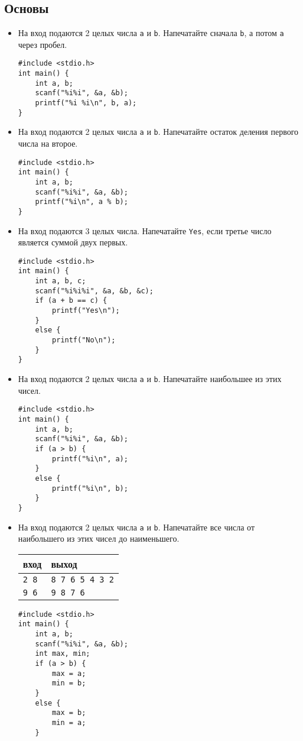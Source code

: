 \documentclass{article}
\begin{document}
\subsection*{Основы}
\begin{itemize}
\item На вход подаются 2 целых числа \texttt{a} и \texttt{b}. Напечатайте сначала \texttt{b}, а потом \texttt{a} через пробел.
\begin{lstlisting}[backgroundcolor = \color{solcolor}]
#include <stdio.h>
int main() {
    int a, b; 
    scanf("%i%i", &a, &b);
    printf("%i %i\n", b, a);
}
\end{lstlisting}
\item На вход подаются 2 целых числа \texttt{a} и \texttt{b}. Напечатайте остаток деления первого числа на второе.
\begin{lstlisting}[backgroundcolor = \color{solcolor}]
#include <stdio.h>
int main() {
    int a, b; 
    scanf("%i%i", &a, &b);
    printf("%i\n", a % b);
}
\end{lstlisting}
\item На вход подаются 3 целых числа. Напечатайте \texttt{Yes}, если третье число является суммой двух первых.
\begin{lstlisting}[backgroundcolor = \color{solcolor}]
#include <stdio.h>
int main() {
    int a, b, c; 
    scanf("%i%i%i", &a, &b, &c);
    if (a + b == c) {
        printf("Yes\n");
    }
    else {
        printf("No\n");
    }
}
\end{lstlisting}
\item На вход подаются 2 целых числа \texttt{a} и \texttt{b}. Напечатайте наибольшее из этих чисел.
\begin{lstlisting}[backgroundcolor = \color{solcolor}]
#include <stdio.h>
int main() {
    int a, b; 
    scanf("%i%i", &a, &b);
    if (a > b) {
        printf("%i\n", a);
    }
    else {
        printf("%i\n", b);
    }
}
\end{lstlisting}
\item На вход подаются 2 целых числа \texttt{a} и \texttt{b}. Напечатайте все числа от наибольшего из этих чисел до наименьшего.
\begin{center}
\begin{tabular}{ l | l }
 вход & выход \\ \hline
 \texttt{2 8} & \texttt{8 7 6 5 4 3 2}  \\ \hline
 \texttt{9 6} & \texttt{9 8 7 6}  \\ 
\end{tabular}
\end{center}
\begin{lstlisting}[backgroundcolor = \color{solcolor}]
#include <stdio.h>
int main() {
    int a, b; 
    scanf("%i%i", &a, &b);
    int max, min;
    if (a > b) {
        max = a;
        min = b;
    }
    else {
        max = b;
        min = a;
    }
    

\end{lstlisting}
\end{itemize}
\end{document}
